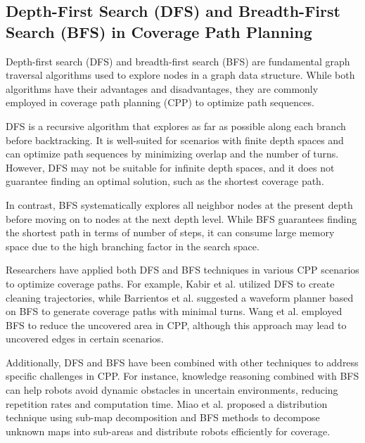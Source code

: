 \subsection{Depth-First Search (DFS) and Breadth-First Search (BFS) in Coverage Path Planning}

Depth-first search (DFS) and breadth-first search (BFS) are fundamental graph traversal algorithms used to explore nodes in a graph data structure. While both algorithms have their advantages and disadvantages, they are commonly employed in coverage path planning (CPP) to optimize path sequences.

\vspace*{6mm}

DFS is a recursive algorithm that explores as far as possible along each branch before backtracking. It is well-suited for scenarios with finite depth spaces and can optimize path sequences by minimizing overlap and the number of turns. However, DFS may not be suitable for infinite depth spaces, and it does not guarantee finding an optimal solution, such as the shortest coverage path.

\vspace*{6mm}

In contrast, BFS systematically explores all neighbor nodes at the present depth before moving on to nodes at the next depth level. While BFS guarantees finding the shortest path in terms of number of steps, it can consume large memory space due to the high branching factor in the search space.

\vspace*{6mm}

Researchers have applied both DFS and BFS techniques in various CPP scenarios to optimize coverage paths. For example, Kabir et al. utilized DFS to create cleaning trajectories, while Barrientos et al. suggested a waveform planner based on BFS to generate coverage paths with minimal turns. Wang et al. employed BFS to reduce the uncovered area in CPP, although this approach may lead to uncovered edges in certain scenarios.

\vspace*{6mm}

Additionally, DFS and BFS have been combined with other techniques to address specific challenges in CPP. For instance, knowledge reasoning combined with BFS can help robots avoid dynamic obstacles in uncertain environments, reducing repetition rates and computation time. Miao et al. proposed a distribution technique using sub-map decomposition and BFS methods to decompose unknown maps into sub-areas and distribute robots efficiently for coverage.


